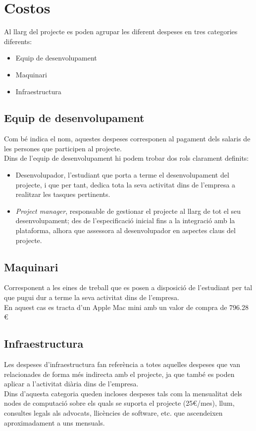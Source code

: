 \section{Costos}
Al llarg del projecte es poden agrupar les diferent despeses en tres categories diferents:
\begin{itemize}
	\item Equip de desenvolupament
	\item Maquinari
	\item Infraestructura
\end{itemize}

\subsection{Equip de desenvolupament}
Com bé indica el nom, aquestes despeses corresponen al pagament dels salaris de les persones que participen al projecte.\\
Dins de l'equip de desenvolupament hi podem trobar dos rols clarament definits:
\begin{itemize}
	\item Desenvolupador, l'estudiant que porta a terme el desenvolupament del projecte, i que per tant, dedica tota la seva activitat dins de l'empresa a realitzar les tasques pertinents.
	\item \textit{Project manager}, responsable de gestionar el projecte al llarg de tot el seu desenvolupament; des de l'especificació inicial fins a la integració amb la plataforma, alhora que assessora al desenvolupador en aspectes claus del projecte. 
\end{itemize}

\subsection{Maquinari}
Corresponent a les eines de treball que es posen a disposició de l'estudiant per tal que pugui dur a terme la seva activitat dins de l'empresa. \\
En aquest cas es tracta d'un Apple Mac mini amb un valor de compra de 796.28 \euro

\subsection{Infraestructura}
Les despeses d'infraestructura fan referència a totes aquelles despeses que van relacionades de forma més indirecta amb el projecte, ja que també es poden aplicar a l'activitat diària dins de l'empresa.\\
\newline Dins d'aquesta categoria queden incloses despeses tals com la mensualitat dels nodes de computació sobre els quals se suporta el projecte (25\euro/mes), llum, consultes legals als advocats, llicències de software, etc. que ascendeixen aproximadament a uns  mensuals.


